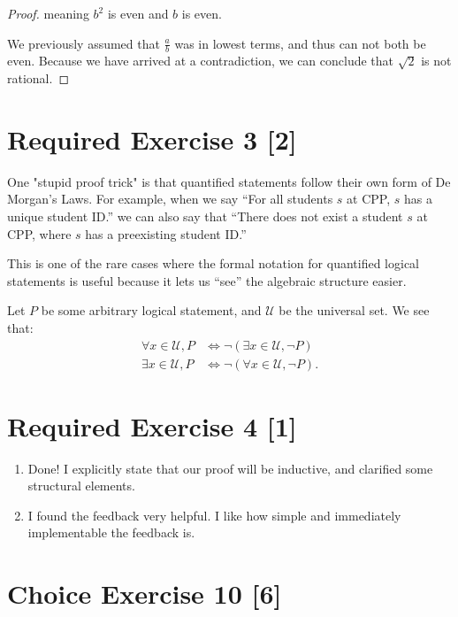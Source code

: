 \documentclass{article}
\begin{document}
\begin{enumerate}
{\begin{proof}
            meaning \(b^2\) is even and \(b\) is even. 

            We previously assumed that \(\frac{a }{b}\) was in lowest terms, and 
            thus can not both be even. Because we have arrived at a contradiction, 
            we can conclude that \(\sqrt{2}\) is not rational. 
        \end{proof}
    }
\end{enumerate}

\section*{Required Exercise 3 [2]}

One "stupid proof trick" is that quantified statements follow their own form of 
De Morgan's Laws. For example, when we say ``For all students \(s\) at CPP, \(s\) 
has a unique student ID.'' we can also say that ``There does not exist a student \(s\)
at CPP, where \(s\) has a preexisting student ID.''

This is one of the rare cases where the formal notation for quantified logical 
statements is useful because it lets us ``see'' the algebraic structure easier. 

Let \(P\) be some arbitrary logical statement, and \(\mathcal{U}\) be the universal set.
We see that:
\begin{align*}
    \forall x \in \mathcal{U}, P &\Leftrightarrow \neg (\exists x \in \mathcal{U}, \neg P)\\
    \exists x \in \mathcal{U}, P &\Leftrightarrow \neg (\forall x \in \mathcal{U}, \neg P).
\end{align*}

\section*{Required Exercise 4 [1]}
\begin{enumerate}
    \item {
        Done! I explicitly state that our proof will be inductive, and clarified 
        some structural elements. 
    }
    \item {
        I found the feedback very helpful. I like how simple and immediately 
        implementable the feedback is. 
    }
\end{enumerate}

\section*{Choice Exercise 10 [6]}
\end{document}
